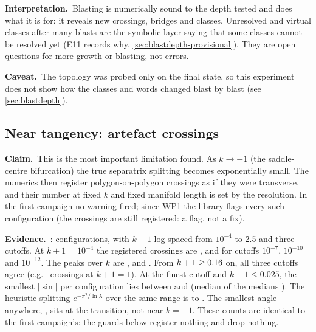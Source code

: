 \documentclass[11pt,a4paper]{article}
\newcommand{\claim}{\par\smallskip\noindent\textbf{Claim.}~}
\newcommand{\evidence}{\par\smallskip\noindent\textbf{Evidence.}~}
\newcommand{\reading}{\par\smallskip\noindent\textbf{Interpretation.}~}
\newcommand{\caveat}{\par\smallskip\noindent\textbf{Caveat.}~}
\begin{document}
\reading Blasting is numerically sound to the depth tested and does what it
is for: it reveals new crossings, bridges and classes. Unresolved and
virtual classes after many blasts are the symbolic layer saying that some
classes cannot be resolved yet (E11 records why, \cref{sec:blastdepth-provisional}). They are open questions for more
growth or blasting, not errors.

\caveat The topology was probed only on the final state, so this
experiment does not show how the classes and words changed blast by blast
(see \cref{sec:blastdepth}).

\subsection{Near tangency: artefact crossings}
\label{sec:tangency}
\claim This is the most important limitation found. As $k\to-1$ (the
saddle-centre bifurcation) the true separatrix splitting becomes
exponentially small. The numerics then register polygon-on-polygon crossings
as if they were transverse, and their number at fixed $k$ and fixed manifold
length is set by the resolution. In the first campaign no warning fired;
since WP1 the library flags every such configuration (the crossings are
still registered: a flag, not a fix).

\evidence {}: \NumTangencyConfigs{} configurations, with $k+1$
log-spaced from $10^{-4}$ to 2.5 and three cutoffs. At $k+1=10^{-4}$ the
registered crossings are \NumTangencyCrossingsNearCutoffSeven,
\NumTangencyCrossingsNearCutoffTen{} and \NumTangencyCrossingsNearCutoffTwelve{}
for cutoffs $10^{-7}$, $10^{-10}$ and $10^{-12}$. The peaks over $k$ are
\NumTangencyCrossingsPeakCutoffSeven, \NumTangencyCrossingsPeakCutoffTen{}
and \NumTangencyCrossingsPeakCutoffTwelve. From $k+1\ge0.16$
on, all three cutoffs agree (e.g.\ \NumTangencyCrossingsFar{} crossings at
$k+1=1$). At the finest cutoff and $k+1\le0.025$, the smallest $|\sin|$ per
configuration lies between \NumTangencyMinSinFineLo{} and
\NumTangencyMinSinFineHi{} (median of the medians \NumTangencyMedianSinFine).
The heuristic splitting $e^{-\pi^2/\ln\lambda}$ over the same range is
\NumTangencyRefNear{} to \NumTangencyRefMid. The smallest angle anywhere,
\NumTangencyMinSin, sits at the transition, not near $k=-1$. These counts
are identical to the first campaign's: the guards below register nothing and
drop nothing.
\end{document}
